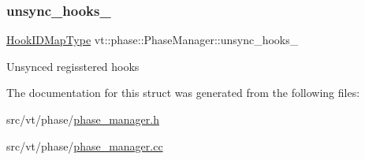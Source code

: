 \subsubsection{\texorpdfstring{unsync\+\_\+hooks\+\_\+}{unsync\_hooks\_}}
{\footnotesize\ttfamily \hyperlink{structvt_1_1phase_1_1_phase_manager_a7f9784fa7550beaa1e7d59e639169a8b}{Hook\+I\+D\+Map\+Type} vt\+::phase\+::\+Phase\+Manager\+::unsync\+\_\+hooks\+\_\+\hspace{0.3cm}{\ttfamily [private]}}

Unsync\textquotesingle{}ed regisstered hooks 

The documentation for this struct was generated from the following files\+:\begin{DoxyCompactItemize}
\item 
src/vt/phase/\hyperlink{phase__manager_8h}{phase\+\_\+manager.\+h}\item 
src/vt/phase/\hyperlink{phase__manager_8cc}{phase\+\_\+manager.\+cc}\end{DoxyCompactItemize}
